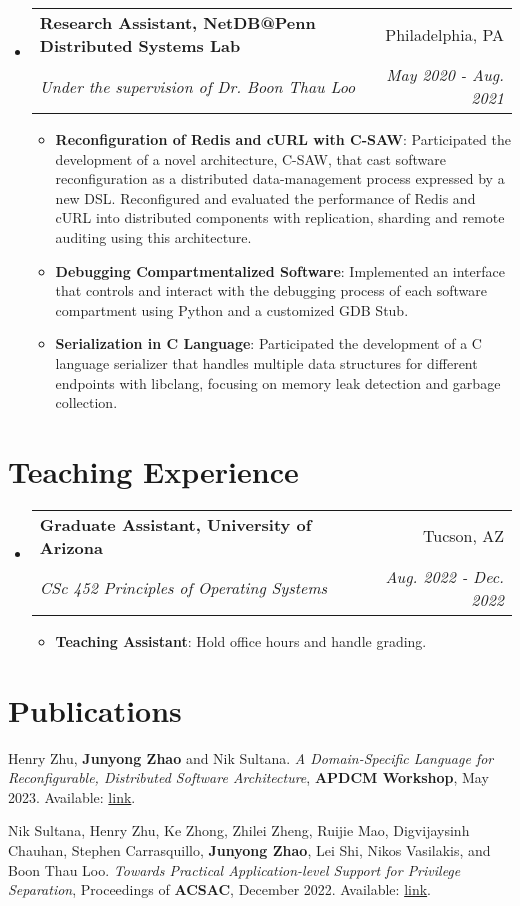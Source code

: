 \documentclass{article}
\makeatletter
\newcommand{\resumeItem}[2]{
  \item\small{
    \textbf{#1}{: #2 \vspace{-2pt}}
  }
}
\newcommand{\resumeSubheading}[4]{
  \vspace{-1pt}\item
    \begin{tabular*}{0.97\textwidth}{l@{\extracolsep{\fill}}r}
      \textbf{#1} & #2 \\
      \textit{#3} & \textit{#4} \\
    \end{tabular*}\vspace{-5pt}
}
\newcommand{\resumeSubHeadingListStart}{\begin{itemize}[leftmargin=*]}
\newcommand{\resumeSubHeadingListEnd}{\end{itemize}}
\newcommand{\resumeItemListStart}{\begin{itemize}}
\newcommand{\resumeItemListEnd}{\end{itemize}\vspace{-5pt}}
\makeatother
\begin{document}
\resumeSubHeadingListStart
\resumeSubheading{Research Assistant, NetDB@Penn Distributed Systems Lab}
{Philadelphia, PA}
{Under the supervision of Dr. Boon Thau Loo}{May 2020 - Aug. 2021}

\resumeItemListStart
\resumeItem{Reconfiguration of Redis and cURL with C-SAW}
{Participated the development of a novel architecture, C-SAW, that cast software
  reconfiguration as a distributed data-management process expressed by a new DSL.
  Reconfigured and evaluated the performance of Redis and cURL into distributed
  components with replication, sharding and remote auditing using this
  architecture.}

\resumeItem{Debugging Compartmentalized Software}
{Implemented an interface that controls and interact with the debugging process
  of each software compartment using Python and a customized GDB Stub.}

\resumeItem{Serialization in C Language}
{Participated the development of a C language serializer that handles multiple
  data structures for different endpoints with libclang, focusing on memory leak
  detection and garbage collection.}
\resumeItemListEnd
\resumeSubHeadingListEnd

\vspace{-2pt}
\section{Teaching Experience}
\resumeSubHeadingListStart
\resumeSubheading{Graduate Assistant, University of Arizona}{Tucson, AZ}
{CSc 452 Principles of Operating Systems}{Aug. 2022 - Dec. 2022}
\resumeItemListStart
\resumeItem{Teaching Assistant}{Hold office hours and handle grading.}
\resumeItemListEnd
\resumeSubHeadingListEnd

\vspace{-2pt}
\section{Publications}
\begin{description}[font=$\bullet$,leftmargin=!]
  \item \small{Henry Zhu, \textbf{Junyong Zhao} and Nik Sultana. \textit{A
            Domain-Specific Language for Reconfigurable, Distributed Software
            Architecture}, \textbf{APDCM Workshop}, May 2023. Available:
          \href{https://apdcm.iss-j.org/doku.php?id=accepted2023}{link}.}
  \item \small{Nik Sultana, Henry Zhu, Ke Zhong, Zhilei Zheng, Ruijie Mao,
          Digvijaysinh Chauhan, Stephen Carrasquillo, \textbf{Junyong Zhao}, Lei
          Shi, Nikos Vasilakis, and Boon Thau Loo. \textit{Towards Practical
            Application-level Support for Privilege Separation}, Proceedings of
          \textbf{ACSAC}, December 2022. Available:
          \href{https://dl.acm.org/doi/pdf/10.1145/3564625.3564664}{link}.}
\end{description}
\end{document}

